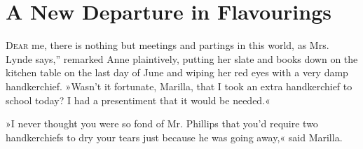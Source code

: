 \chapter{A New Departure in Flavourings}

\lettrine[ante=“,lines=4]{D}{ear} me, there is nothing but meetings and partings in this world, as Mrs. Lynde says,” remarked Anne plaintively, putting her slate and books down on the kitchen table on the last day of June and wiping her red eyes with a very damp handkerchief. »Wasn’t it fortunate, Marilla, that I took an extra handkerchief to school today? I had a presentiment that it would be needed.«

»I never thought you were so fond of Mr. Phillips that you’d require two handkerchiefs to dry your tears just because he was going away,« said Marilla.

